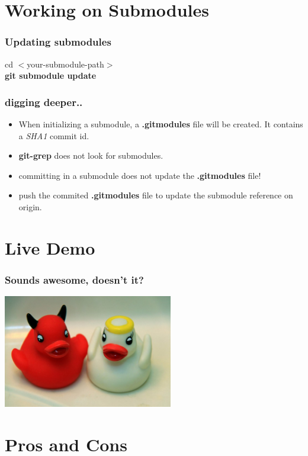 \documentclass[10pt]{beamer}
\begin{document}
\section{Working on Submodules}



\begin{frame}
\frametitle{Updating submodules}
\begin{center}cd $<$your-submodule-path$>$\\\textbf{git submodule update}\end{center}
\end{frame}

\begin{frame}
	\frametitle{digging deeper..}
	\begin{itemize}
		\item When initializing a submodule, a \textbf{.gitmodules} file will be created. It contains a \emph{SHA1} commit id.
		\item \textbf{git-grep} does not look for submodules.
		\item committing in a submodule does not update the \textbf{.gitmodules} file!
		\item push the commited \textbf{.gitmodules} file to update the submodule reference on origin.
	\end{itemize}
\end{frame}

\section{Live Demo}

\begin{frame}
	\frametitle{Sounds awesome, doesn't it?}
\begin{center}\includegraphics[width=280px]{images/goodbad.jpg}\end{center}
\end{frame}

\section{Pros and Cons}
\end{document}
